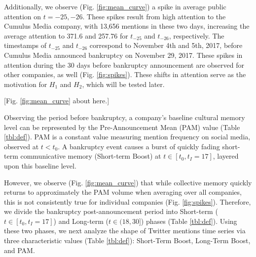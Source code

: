 \documentclass[9pt,twocolumn,twoside,lineno]{pnas-new}
\begin{document}
Additionally, we observe (Fig. \ref{fig:mean_curve}) a spike in average public attention on $t=-25, -26$. 
These spikes result from high attention to the Cumulus Media company, with 13,656 mentions in these two days, increasing the average attention to 371.6 and 257.76 for $t_{-25}$ and $t_{-26}$, respectively.
The timestamps of $t_{-25}$ and $t_{-26}$ correspond to November 4th and 5th, 2017, before Cumulus Media announced bankruptcy on November 29, 2017.
These spikes in attention during the 30 days before bankruptcy announcement are observed for other companies, as well (Fig. \ref{fig:spikes}).
These shifts in attention serve as the motivation for $H_1$ and $H_2$, which will be tested later.

\centerline{[Fig. \ref{fig:mean_curve} about here.]}


Observing the period before bankruptcy, a company's baseline cultural memory level can be represented by the Pre-Announcement Mean (PAM) value (Table \ref{tbl:def}).
PAM is a constant value measuring mention frequency on social media, observed at $t<t_0$.
A bankruptcy event causes a burst of quickly fading short-term communicative memory (Short-term Boost) at $t \in [t_0,t_I=17]$, layered upon this baseline level.

However, we observe (Fig. \ref{fig:mean_curve}) that while collective memory quickly returns to approximately the PAM volume when averaging over all companies, this is not consistently true for individual companies (Fig. \ref{fig:spikes}).
Therefore, we divide the bankruptcy post-announcement period into Short-term ($t\in[t_0, t_I=17]$) and Long-term ($t\in(18,30]$) phases (Table \ref{tbl:def}).
Using these two phases, we next analyze the shape of Twitter mentions time series via three characteristic values (Table \ref{tbl:def}): Short-Term Boost, Long-Term Boost, and PAM.
\end{document}
